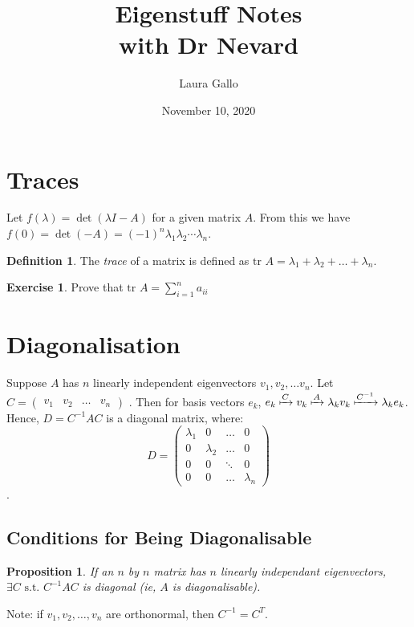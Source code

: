 \documentclass{article}
\title{Eigenstuff Notes \\ with Dr Nevard}
\author{Laura Gallo}
\date{November 10, 2020}
\newtheorem{proposition}{Proposition}
\theoremstyle{definition}
\newtheorem{definition}{Definition}
\newtheorem{exercise}{Exercise}
\newcommand{\st}{\text{ s.t. }}
\begin{document}
\maketitle

\section{Traces}
Let $f(\lambda)=\det(\lambda I - A)$ for a given matrix $A$. From this we have $f(0)=\det(-A)=(-1)^n\lambda_1\lambda_2\cdots\lambda_n$.

\begin{definition}
	The \emph{trace} of a matrix is defined as $\text{tr } A = \lambda_1+\lambda_2+\dots+\lambda_n$.
\end{definition}

\begin{exercise}
	Prove that $\text{tr } A = \sum_{i=1}^n a_{ii}$
\end{exercise}

\section{Diagonalisation}
Suppose $A$ has $n$ linearly independent eigenvectors $v_1, v_2, \dots v_n$. Let
\begin{math}
	C=\left(
		\begin{matrix}
			v_1 & v_2 & \dots & v_n
		\end{matrix}
	\right)
\end{math}
. Then for basis vectors $e_k$, $e_k \xmapsto{C} v_k \xmapsto{A} \lambda_kv_k \xmapsto{C^{-1}} \lambda_ke_k$. Hence, $D=C^{-1}AC$ is a diagonal matrix, where:
\begin{equation*}
	D = \left(
		\begin{matrix}
			\lambda_1 & 0 & \dots & 0 \\
			0 & \lambda_2 & \dots & 0 \\
			0 & 0 & \ddots & 0 \\
			0 & 0 & \dots & \lambda_n
		\end{matrix}
	\right)
\end{equation*}.

\subsection{Conditions for Being Diagonalisable}
\begin{proposition}
	If an $n$ by $n$ matrix has $n$ linearly independant eigenvectors, $\exists C \st C^{-1}AC$ is diagonal (ie, $A$ is diagonalisable).
\end{proposition}
\noindent
Note: if $v_1, v_2, \dots, v_n$ are orthonormal, then $C^{-1} = C^T$.
\end{document}
